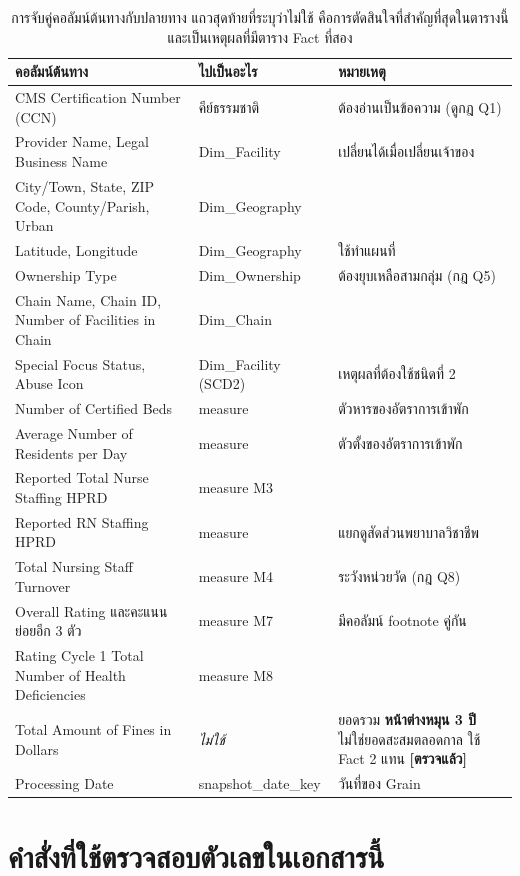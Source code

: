 \documentclass[11pt,a4paper]{article}
\newcommand{\sansall}{\sffamily}
\newcommand{\ok}{\textcolor{dw}{\textbf{[ตรวจแล้ว]}}}
\begin{document}
\begin{table}[H]\centering\small
\begin{tabular}{L{6.6cm} L{2.6cm} L{6.0cm}}
\toprule
\sansall\bfseries คอลัมน์ต้นทาง & \sansall\bfseries ไปเป็นอะไร &
\sansall\bfseries หมายเหตุ \\
\midrule
CMS Certification Number (CCN) & คีย์ธรรมชาติ & ต้องอ่านเป็นข้อความ (ดูกฎ Q1) \\
Provider Name, Legal Business Name & Dim\_Facility & เปลี่ยนได้เมื่อเปลี่ยนเจ้าของ \\
City/Town, State, ZIP Code, County/Parish, Urban & Dim\_Geography & \\
Latitude, Longitude & Dim\_Geography & ใช้ทำแผนที่ \\
Ownership Type & Dim\_Ownership & ต้องยุบเหลือสามกลุ่ม (กฎ Q5) \\
Chain Name, Chain ID, Number of Facilities in Chain & Dim\_Chain & \\
Special Focus Status, Abuse Icon & Dim\_Facility (SCD2) & เหตุผลที่ต้องใช้ชนิดที่ 2 \\
Number of Certified Beds & measure & ตัวหารของอัตราการเข้าพัก \\
Average Number of Residents per Day & measure & ตัวตั้งของอัตราการเข้าพัก \\
Reported Total Nurse Staffing HPRD & measure M3 & \\
Reported RN Staffing HPRD & measure & แยกดูสัดส่วนพยาบาลวิชาชีพ \\
Total Nursing Staff Turnover & measure M4 & ระวังหน่วยวัด (กฎ Q8) \\
Overall Rating และคะแนนย่อยอีก 3 ตัว & measure M7 & มีคอลัมน์ footnote คู่กัน \\
Rating Cycle 1 Total Number of Health Deficiencies & measure M8 & \\
Total Amount of Fines in Dollars & \emph{ไม่ใช้} & ยอดรวม \textbf{หน้าต่างหมุน 3 ปี}
  ไม่ใช่ยอดสะสมตลอดกาล ใช้ Fact 2 แทน \ok{} \\
Processing Date & snapshot\_date\_key & วันที่ของ Grain \\
\bottomrule
\end{tabular}
\caption{การจับคู่คอลัมน์ต้นทางกับปลายทาง แถวสุดท้ายที่ระบุว่าไม่ใช้ คือการตัดสินใจที่สำคัญที่สุดในตารางนี้ และเป็นเหตุผลที่มีตาราง Fact ที่สอง}
\end{table}

\section{คำสั่งที่ใช้ตรวจสอบตัวเลขในเอกสารนี้}
\end{document}
